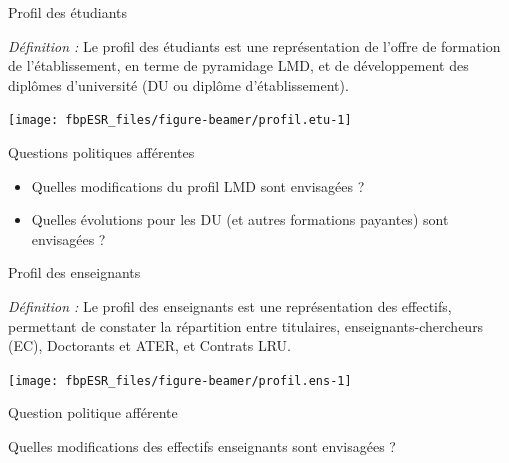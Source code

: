 \documentclass[
  8pt,
  french,
  ignorenonframetext,
  landscape]{beamer}
\providecommand{\tightlist}{%
  \setlength{\itemsep}{0pt}\setlength{\parskip}{0pt}}
\begin{document}
\begin{frame}{Profil des étudiants}
\protect\hypertarget{profil-des-uxe9tudiants}{}

\emph{Définition :} Le profil des étudiants est une représentation de
l'offre de formation de l'établissement, en terme de pyramidage LMD, et
de développement des diplômes d'université (DU ou diplôme
d'établissement).

\begin{center}\texttt{[image: fbpESR\_files/figure-beamer/profil.etu-1]} \end{center}

\begin{block}{Questions politiques afférentes}

\begin{itemize}
\tightlist
\item
  Quelles modifications du profil LMD sont envisagées ?
\item
  Quelles évolutions pour les DU (et autres formations payantes) sont
  envisagées ?
\end{itemize}

\end{block}

\end{frame}

\begin{frame}{Profil des enseignants}
\protect\hypertarget{profil-des-enseignants}{}

\emph{Définition :} Le profil des enseignants est une représentation des
effectifs, permettant de constater la répartition entre titulaires,
enseignants-chercheurs (EC), Doctorants et ATER, et Contrats LRU.

\begin{center}\texttt{[image: fbpESR\_files/figure-beamer/profil.ens-1]} \end{center}

\begin{block}{Question politique afférente}

Quelles modifications des effectifs enseignants sont envisagées ?

\end{block}

\end{frame}
\end{document}
